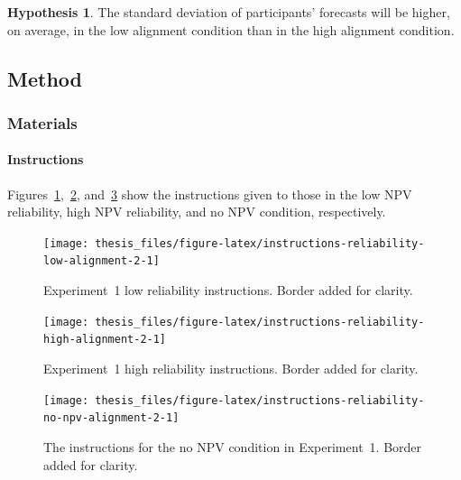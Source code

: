 \documentclass[a4paper, nobind, dvipsnames]{templates/ociamthesis}
\theoremstyle{definition}
\theoremstyle{definition}
\theoremstyle{definition}
\theoremstyle{definition}
\newtheorem{hypothesis}{Hypothesis}[chapter]
\theoremstyle{remark}
\begin{document}
\begin{hypothesis}
\protect\hypertarget{hyp:forecasting-sd-alignment-alignment-2}{}{\label{hyp:forecasting-sd-alignment-alignment-2} }The standard deviation of participants' forecasts will be higher, on average,
in the low alignment condition than in the high alignment condition.
\end{hypothesis}

\subsection{Method}

\hypertarget{materials-alignment-2-appendix}{%
\subsubsection{Materials}\label{materials-alignment-2-appendix}}

\hypertarget{instructions-materials-alignment-2-appendix}{%
\paragraph{Instructions}\label{instructions-materials-alignment-2-appendix}}

Figures~\ref{fig:instructions-reliability-low-alignment-2},~\ref{fig:instructions-reliability-high-alignment-2},
and~\ref{fig:instructions-reliability-no-npv-alignment-2} show the instructions
given to those in the low NPV reliability, high NPV reliability, and no NPV
condition, respectively.



\begin{figure}
\texttt{[image: thesis\_files/figure-latex/instructions-reliability-low-alignment-2-1]} \caption{Experiment~1 low reliability instructions. Border added for clarity.}\label{fig:instructions-reliability-low-alignment-2}
\end{figure}



\begin{figure}
\texttt{[image: thesis\_files/figure-latex/instructions-reliability-high-alignment-2-1]} \caption{Experiment~1 high reliability instructions. Border added for clarity.}\label{fig:instructions-reliability-high-alignment-2}
\end{figure}



\begin{figure}
\texttt{[image: thesis\_files/figure-latex/instructions-reliability-no-npv-alignment-2-1]} \caption{The instructions for the no NPV condition in Experiment~1. Border added for clarity.}\label{fig:instructions-reliability-no-npv-alignment-2}
\end{figure}
\end{document}
